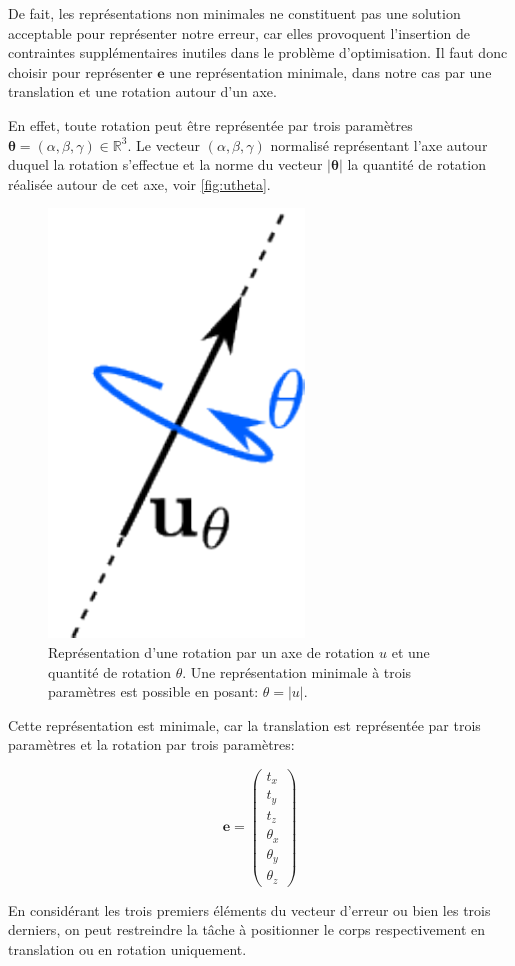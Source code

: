 De fait, les représentations non minimales ne constituent pas une
solution acceptable pour représenter notre erreur, car elles
provoquent l'insertion de contraintes supplémentaires inutiles dans le
problème d'optimisation. Il faut donc choisir pour représenter
$\mathbf{e}$ une représentation minimale, dans notre cas par une
translation et une rotation autour d'un axe.

En effet, toute rotation peut être représentée par trois paramètres
\mbox{$\mathbf{\theta} = (\alpha, \beta, \gamma) \in \mathbb{R}^3$}. Le
vecteur $(\alpha, \beta, \gamma)$ normalisé représentant l'axe autour
duquel la rotation s'effectue et la norme du vecteur
$|\mathbf{\theta}|$ la quantité de rotation réalisée autour de cet
axe, voir \autoref{fig:utheta}.

\begin{figure}
  \begin{center}
    \includegraphics[width=.1\linewidth]{src/chap3-primitive-mouvement/utheta.pdf}
  \end{center}
  \caption{Représentation d'une rotation par un axe de rotation $u$ et
    une quantité de rotation $\theta$. Une représentation minimale à
    trois paramètres est possible en posant: $\theta = |u|$. \label{fig:utheta}}
\end{figure}


Cette représentation est minimale, car la translation est représentée
par trois paramètres et la rotation par trois paramètres:

\begin{equation}
  \mathbf{e} = \left(
  \begin{array}{c}
    t_x\\
    t_y\\
    t_z\\
    \theta_x\\
    \theta_y\\
    \theta_z
  \end{array}
  \right)
\end{equation}

En considérant les trois premiers éléments du vecteur d'erreur ou bien
les trois derniers, on peut restreindre la tâche à positionner le corps
respectivement en translation ou en rotation uniquement.


